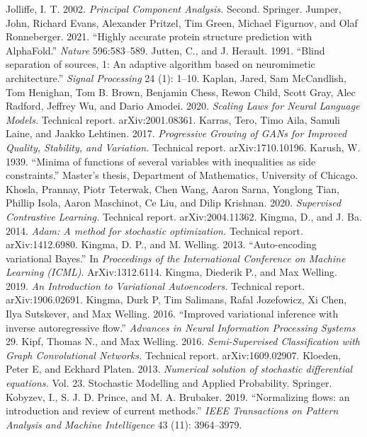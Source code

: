  Jolliffe, I. T. 2002. \emph{Principal Component Analysis.} Second. Springer.
 Jumper, John, Richard Evans, Alexander Pritzel, Tim Green, Michael Figurnov, and Olaf Ronneberger. 2021. ``Highly accurate protein structure prediction with AlphaFold.'' \emph{Nature} 596:583--589.
 Jutten, C., and J. Herault. 1991. ``Blind separation of sources, 1: An adaptive algorithm based on neuromimetic architecture.'' \emph{Signal Processing} 24 (1): 1--10.
 Kaplan, Jared, Sam McCandlish, Tom Henighan, Tom B. Brown, Benjamin Chess, Rewon Child, Scott Gray, Alec Radford, Jeffrey Wu, and Dario Amodei. 2020. \emph{Scaling Laws for Neural Language Models.} Technical report. arXiv:2001.08361.
 Karras, Tero, Timo Aila, Samuli Laine, and Jaakko Lehtinen. 2017. \emph{Progressive Growing of GANs for Improved Quality, Stability, and Variation.} Technical report. arXiv:1710.10196.
 Karush, W. 1939. ``Minima of functions of several variables with inequalities as side constraints.'' Master's thesis, Department of Mathematics, University of Chicago.
 Khosla, Prannay, Piotr Teterwak, Chen Wang, Aaron Sarna, Yonglong Tian, Phillip Isola, Aaron Maschinot, Ce Liu, and Dilip Krishnan. 2020. \emph{Supervised Contrastive Learning.} Technical report. arXiv:2004.11362.
 Kingma, D., and J. Ba. 2014. \emph{Adam: A method for stochastic optimization.} Technical report. arXiv:1412.6980.
 Kingma, D. P., and M. Welling. 2013. ``Auto-encoding variational Bayes.'' In \emph{Proceedings of the International Conference on Machine Learning (ICML)}. ArXiv:1312.6114.
 Kingma, Diederik P., and Max Welling. 2019. \emph{An Introduction to Variational Autoencoders.} Technical report. arXiv:1906.02691.
 Kingma, Durk P, Tim Salimans, Rafal Jozefowicz, Xi Chen, Ilya Sutskever, and Max Welling. 2016. ``Improved variational inference with inverse autoregressive flow.'' \emph{Advances in Neural Information Processing Systems} 29.
 Kipf, Thomas N., and Max Welling. 2016. \emph{Semi-Supervised Classification with Graph Convolutional Networks.} Technical report. arXiv:1609.02907.
 Kloeden, Peter E, and Eckhard Platen. 2013. \emph{Numerical solution of stochastic differential equations.} Vol. 23. Stochastic Modelling and Applied Probability. Springer.
 Kobyzev, I., S. J. D. Prince, and M. A. Brubaker. 2019. ``Normalizing flows: an introduction and review of current methods.'' \emph{IEEE Transactions on Pattern Analysis and Machine Intelligence} 43 (11): 3964--3979.
